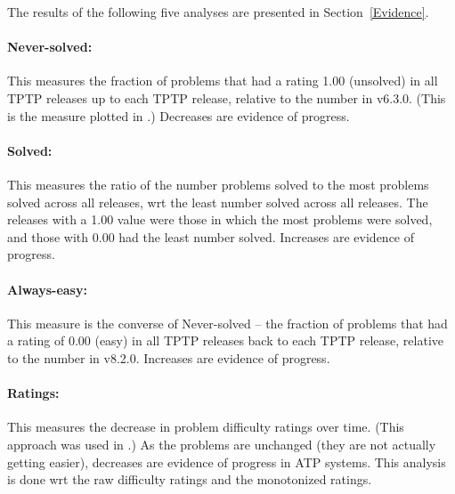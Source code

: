 \documentclass[runningheads]{llncs}
\begin{document}
\noindent
The results of the following five analyses are presented in Section~\ref{Evidence}.

\vspace*{-0.5em}
\paragraph{Never-solved:}
This measures the fraction of problems that had a rating 1.00 (unsolved) in all TPTP releases 
up to each TPTP release, relative to the number in v6.3.0.
(This is the measure plotted in \cite{SSP21}.)
Decreases are evidence of progress.

\vspace*{-0.5em}
\paragraph{Solved:}
This measures the ratio of the number problems solved to the most problems solved across all 
releases, wrt the least number solved across all releases.
The releases with a 1.00 value were those in which the most problems were solved, and those with
0.00 had the least number solved.
Increases are evidence of progress.

\vspace*{-0.5em}
\paragraph{Always-easy:}
This measure is the converse of Never-solved -- the fraction of problems that had a rating of 
0.00 (easy) in all TPTP releases back to each TPTP release, relative to the number in v8.2.0.
Increases are evidence of progress.

\vspace*{-0.5em}
\paragraph{Ratings:}
This measures the decrease in problem difficulty ratings over time. 
(This approach was used in \cite{SFS01}.)
As the problems are unchanged (they are not actually getting easier), decreases are 
evidence of progress in ATP systems.
This analysis is done wrt the raw difficulty ratings and the monotonized ratings.
\end{document}
